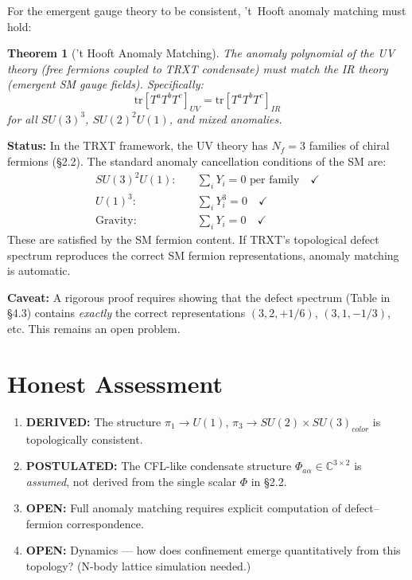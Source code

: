 \documentclass[12pt]{article}
\newtheorem{theorem}{Theorem}
\begin{document}
For the emergent gauge theory to be consistent, 't~Hooft anomaly matching must hold:

\begin{theorem}['t Hooft Anomaly Matching]
The anomaly polynomial of the UV theory (free fermions coupled to TRXT condensate) must match the IR theory (emergent SM gauge fields). Specifically:
\begin{equation}
    \text{tr}[T^a T^b T^c]_{UV} = \text{tr}[T^a T^b T^c]_{IR}
\end{equation}
for all $SU(3)^3$, $SU(2)^2 U(1)$, and mixed anomalies.
\end{theorem}

\textbf{Status:} In the TRXT framework, the UV theory has $N_f = 3$ families of chiral fermions (§2.2). The standard anomaly cancellation conditions of the SM are:
\begin{align}
    SU(3)^2 U(1): &\quad \sum_i Y_i = 0 \text{ per family} \quad \checkmark \\
    U(1)^3: &\quad \sum_i Y_i^3 = 0 \quad \checkmark \\
    \text{Gravity}: &\quad \sum_i Y_i = 0 \quad \checkmark
\end{align}
These are satisfied by the SM fermion content. If TRXT's topological defect spectrum reproduces the correct SM fermion representations, anomaly matching is automatic.

\textbf{Caveat:} A rigorous proof requires showing that the defect spectrum (Table in §4.3) contains \textit{exactly} the correct representations $(3, 2, +1/6)$, $(3, 1, -1/3)$, etc. This remains an open problem.

\section{Honest Assessment}

\begin{enumerate}
    \item \textbf{DERIVED:} The structure $\pi_1 \to U(1)$, $\pi_3 \to SU(2) \times SU(3)_{color}$ is topologically consistent.
    \item \textbf{POSTULATED:} The CFL-like condensate structure $\Phi_{a\alpha} \in \mathbb{C}^{3 \times 2}$ is \textit{assumed}, not derived from the single scalar $\Phi$ in §2.2.
    \item \textbf{OPEN:} Full anomaly matching requires explicit computation of defect--fermion correspondence.
    \item \textbf{OPEN:} Dynamics — how does confinement emerge quantitatively from this topology? (N-body lattice simulation needed.)
\end{enumerate}
\end{document}
